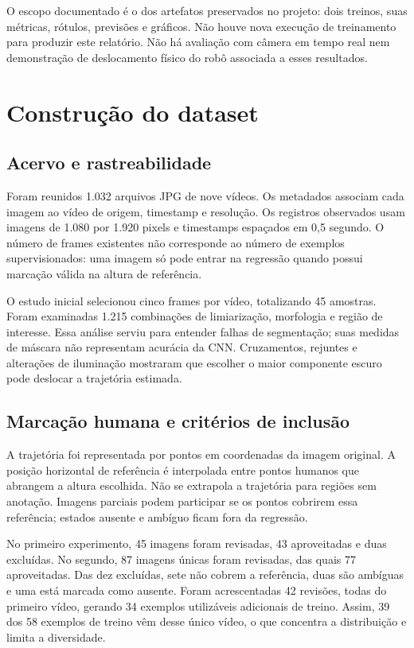 \documentclass[a4paper,oneside,11pt]{article}
\begin{document}
O escopo documentado é o dos artefatos preservados no projeto: dois treinos, suas métricas, rótulos, previsões e gráficos. Não houve nova execução de treinamento para produzir este relatório. Não há avaliação com câmera em tempo real nem demonstração de deslocamento físico do robô associada a esses resultados.

\section{Construção do dataset}
\subsection{Acervo e rastreabilidade}
Foram reunidos 1.032 arquivos JPG de nove vídeos. Os metadados associam cada imagem ao vídeo de origem, timestamp e resolução. Os registros observados usam imagens de 1.080 por 1.920 pixels e timestamps espaçados em 0,5 segundo. O número de frames existentes não corresponde ao número de exemplos supervisionados: uma imagem só pode entrar na regressão quando possui marcação válida na altura de referência.

O estudo inicial selecionou cinco frames por vídeo, totalizando 45 amostras. Foram examinadas 1.215 combinações de limiarização, morfologia e região de interesse. Essa análise serviu para entender falhas de segmentação; suas medidas de máscara não representam acurácia da CNN. Cruzamentos, rejuntes e alterações de iluminação mostraram que escolher o maior componente escuro pode deslocar a trajetória estimada.

\subsection{Marcação humana e critérios de inclusão}
A trajetória foi representada por pontos em coordenadas da imagem original. A posição horizontal de referência é interpolada entre pontos humanos que abrangem a altura escolhida. Não se extrapola a trajetória para regiões sem anotação. Imagens parciais podem participar se os pontos cobrirem essa referência; estados ausente e ambíguo ficam fora da regressão.

No primeiro experimento, 45 imagens foram revisadas, 43 aproveitadas e duas excluídas. No segundo, 87 imagens únicas foram revisadas, das quais 77 aproveitadas. Das dez excluídas, sete não cobrem a referência, duas são ambíguas e uma está marcada como ausente. Foram acrescentadas 42 revisões, todas do primeiro vídeo, gerando 34 exemplos utilizáveis adicionais de treino. Assim, 39 dos 58 exemplos de treino vêm desse único vídeo, o que concentra a distribuição e limita a diversidade.
\end{document}
